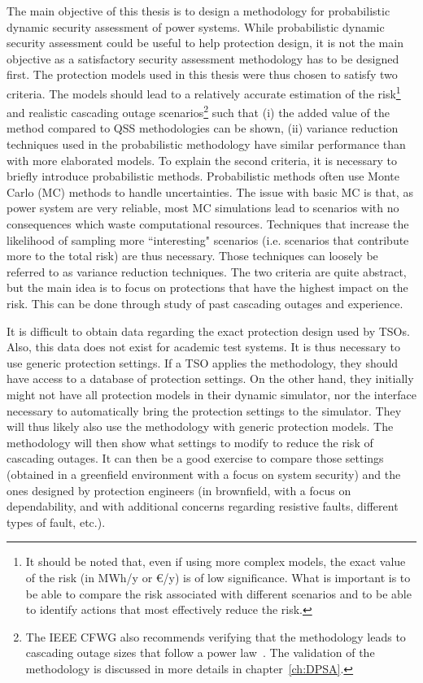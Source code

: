 The main objective of this thesis is to design a methodology for probabilistic dynamic security assessment of power systems. While probabilistic dynamic security assessment could be useful to help protection design, it is not the main objective as a satisfactory security assessment methodology has to be designed first. The protection models used in this thesis were thus chosen to satisfy two criteria. The models should lead to a relatively accurate estimation of the risk\footnote{It should be noted that, even if using more complex models, the exact value of the risk (in MWh/y or €/y) is of low significance. What is important is to be able to compare the risk associated with different scenarios and to be able to identify actions that most effectively reduce the risk.} and realistic cascading outage scenarios\footnote{The IEEE CFWG also recommends verifying that the methodology leads to cascading outage sizes that follow a power law~\cite{Benchmarking2016}. The validation of the methodology is discussed in more details in chapter~\ref{ch:DPSA}.} such that (i) the added value of the method compared to QSS methodologies can be shown, (ii) variance reduction techniques used in the probabilistic methodology have similar performance than with more elaborated models. To explain the second criteria, it is necessary to briefly introduce probabilistic methods. Probabilistic methods often use Monte Carlo (MC) methods to handle uncertainties. The issue with basic MC is that, as power system are very reliable, most MC simulations lead to scenarios with no consequences which waste computational resources. Techniques that increase the likelihood of sampling more ``interesting" scenarios (i.e. scenarios that contribute more to the total risk) are thus necessary. Those techniques can loosely be referred to as variance reduction techniques. The two criteria are quite abstract, but the main idea is to focus on protections that have the highest impact on the risk. This can be done through study of past cascading outages and experience.

It is difficult to obtain data regarding the exact protection design used by TSOs. Also, this data does not exist for academic test systems. It is thus necessary to use generic protection settings. If a TSO applies the methodology, they should have access to a database of protection settings. On the other hand, they initially might not have all protection models in their dynamic simulator, nor the interface necessary to automatically bring the protection settings to the simulator. They will thus likely also use the methodology with generic protection models. The methodology will then show what settings to modify to reduce the risk of cascading outages. It can then be a good exercise to compare those settings (obtained in a greenfield environment with a focus on system security) and the ones designed by protection engineers (in brownfield, with a focus on dependability, and with additional concerns regarding resistive faults, different types of fault, etc.).


